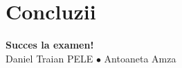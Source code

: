 \documentclass[9pt, aspectratio=169, t]{beamer}
\begin{document}
\section{Concluzii}

\begin{frame}{}
\vfill
\begin{center}
\begin{block}{}
\centering
\textbf{\Large Succes la examen!}\\[0.4em]
\small Daniel Traian PELE \quad $\bullet$ \quad Antoaneta Amza
\end{block}
\end{center}
\vfill
\end{frame}
\end{document}
